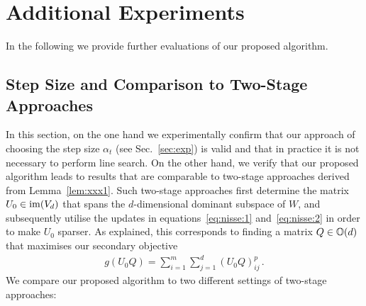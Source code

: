 \documentclass{article}
\begin{document}
\section{Additional Experiments}
In the following we provide further evaluations of our proposed algorithm.

\subsection{Step Size and Comparison to Two-Stage Approaches}
%
In this section, on the one hand we experimentally confirm that our  approach of choosing the step size $\alpha_t$ (see Sec.~\ref{sec:exp}) is valid  and that
%
in practice
it is not necessary to perform line search. On the other hand, 
%
%
we verify that our 
%
proposed algorithm leads to results that are comparable to two-stage approaches derived from Lemma~\ref{lem:xxx1}. Such two-stage approaches
%
first determine the matrix $U_0 \in \operatorname{im}(V_d)$ that spans the $d$-dimensional dominant subspace of $W$, and subsequently utilise the updates in equations~\eqref{eq:nisse:1} and~\eqref{eq:nisse:2} in order to make $U_0$ sparser.
As explained, this corresponds to finding a matrix $Q \in \mathbb{O}(d)$ 
that maximises our secondary objective 
\begin{align}\label{eq:secapp}
    g(U_0Q) = \sum_{i=1}^m \sum_{j=1}^d (U_0Q)_{ij}^p\,.
\end{align}
%
We compare our proposed algorithm to two different settings of  two-stage approaches:
%
%
\end{document}
